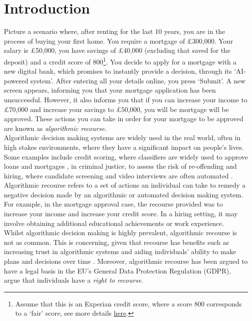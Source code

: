 \chapter{Introduction}

Picture a scenario where, after renting for the last 10 years, you are in the process of buying your first home. You require a mortgage of £300,000. Your salary is £50,000, you have savings of £40,000 (excluding that saved for the deposit) and a credit score of 800\footnote{Assume that this is an Experian credit score, where a score 800 corresponds to a `fair' score, see more details \href{https://www.experian.co.uk/consumer/experian-credit-score.html}{here}.}. You decide to apply for a mortgage with a new digital bank, which promises to instantly provide a decision, through its `AI-powered system'. After entering all your details online, you press `Submit'. A new screen appears, informing you that your mortgage application has been unsuccessful. However, it also informs you that if you can increase your income to £70,000 and increase your savings to £50,000, you will be mortgage will be approved. These actions you can take in order for your mortgage to be approved are known as \textit{algorithmic recourse}.\\

Algorithmic decision making systems are widely used in the real world, often in high stakes environments, where they have a significant impact on people's lives. Some examples include credit scoring, where classifiers are widely used to approve loans and mortgages \citep{odwyerAreYouCreditworthy2018}, in criminal justice, to assess the risk of re-offending \citep{angwinMachineBias2016} and hiring, where candidate screening and video interviews are often automated \citep{kramerProblemsAIVideo2022}. Algorithmic recourse refers to a set of actions an individual can take to remedy a negative decision made by an algorithmic or automated decision making system. For example, in the mortgage approval case, the recourse provided was to increase your income and increase your credit score. In a hiring setting, it may involve obtaining additional educational achievements or work experience.\\


Whilst algorithmic decision making is highly prevalent, algorithmic recourse is not as common. This is concerning, given that recourse has benefits such as increasing trust in algorithmic systems and aiding individuals' ability to make plans and decisions over time \citep{venkatasubramanianPhilosophicalBasisAlgorithmic2020}. Moreover, algorithmic recourse has been argued to have a legal basis in the EU's General Data Protection Regulation (GDPR), \textcite{voigtEUGeneralData2017} argue that individuals have a \textit{right to recourse}.\\

